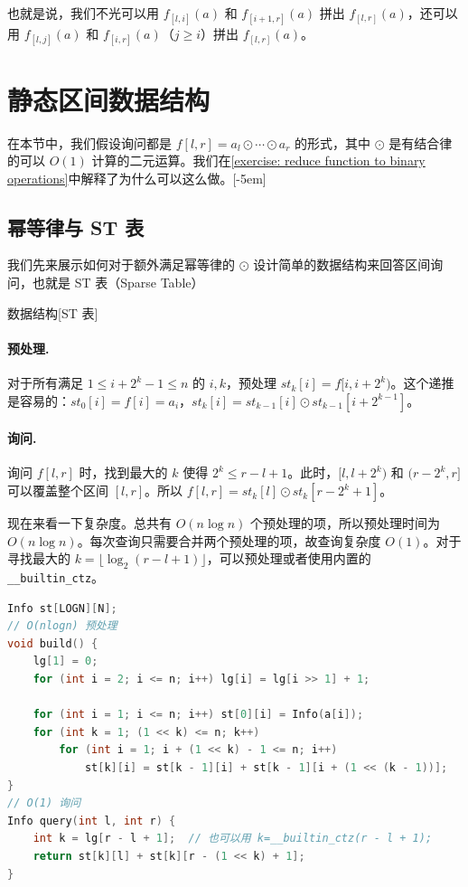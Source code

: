 也就是说，我们不光可以用 $f_{[l,i]}(a)$ 和 $f_{[i+1,r]}(a)$ 拼出 $f_{[l,r]}(a)$，还可以用 $f_{[l,j]}(a)$ 和 $f_{[i,r]}(a)$（$j\ge i$）拼出 $f_{[l,r]}(a)$。



\section{静态区间数据结构}

在本节中，我们假设询问都是 $f[l,r]=a_l\odot\cdots \odot a_r$ 的形式，其中 $\odot$ 是有结合律的可以 $O(1)$ 计算的二元运算。我们在\cref{exercise: reduce function to binary operations}中解释了为什么可以这么做。[-5em]

\subsection{幂等律与 ST 表}

我们先来展示如何对于额外满足幂等律的 $\odot$ 设计简单的数据结构来回答区间询问，也就是 ST 表（Sparse Table）

\begin{descbox}{数据结构}[ST 表]
\paragraph{预处理. }对于所有满足 $1\le i+2^k-1\le n$ 的 $i,k$，预处理 $st_k[i]=f[i,i+2^k)$。这个递推是容易的：$st_0[i]=f[i]=a_i$，$st_k[i]=st_{k-1}[i]\odot st_{k-1}[i+2^{k-1}]$。

\paragraph{询问.} 询问 $f[l,r]$ 时，找到最大的 $k$ 使得 $2^k\le r-l+1$。此时，$[l,l+2^k)$ 和 $(r-2^k,r]$ 可以覆盖整个区间 $[l,r]$。所以 $f[l,r]=st_k[l]\odot st_k[r-2^k+1]$。
\end{descbox}

现在来看一下复杂度。总共有 $O(n\log n)$ 个预处理的项，所以预处理时间为 $O(n\log n)$。每次查询只需要合并两个预处理的项，故查询复杂度 $O(1)$。对于寻找最大的 $k=\lfloor \log_2 (r-l+1)\rfloor$，可以预处理或者使用内置的 \verb|__builtin_ctz|。

\begin{lstlisting}[language=C++, caption={ST 表}]
Info st[LOGN][N];
// O(nlogn) 预处理
void build() {
    lg[1] = 0;
    for (int i = 2; i <= n; i++) lg[i] = lg[i >> 1] + 1;

    for (int i = 1; i <= n; i++) st[0][i] = Info(a[i]);
    for (int k = 1; (1 << k) <= n; k++)
        for (int i = 1; i + (1 << k) - 1 <= n; i++)
            st[k][i] = st[k - 1][i] + st[k - 1][i + (1 << (k - 1))];
}
// O(1) 询问
Info query(int l, int r) {
    int k = lg[r - l + 1];  // 也可以用 k=__builtin_ctz(r - l + 1);
    return st[k][l] + st[k][r - (1 << k) + 1];
}
\end{lstlisting}

